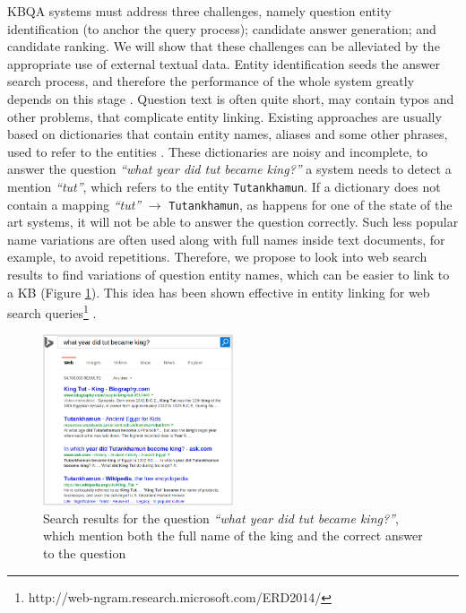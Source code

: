 KBQA systems must address three challenges, namely question entity identification (to anchor the query process); candidate answer generation; and candidate ranking.
We will show that these challenges can be alleviated by the appropriate use of external textual data.
Entity identification seeds the answer search process, and therefore the performance of the whole system greatly depends on this stage \cite{yao-scratch-qa-naacl2015}.
Question text is often quite short, may contain typos and other problems, that complicate entity linking.
Existing approaches are usually based on dictionaries that contain entity names, aliases and some other phrases, used to refer to the entities \cite{SPITKOVSKY12.266}.
These dictionaries are noisy and incomplete, \eg to answer the question \textit{``what year did tut became king?''} a system needs to detect a mention \textit{``tut''}, which refers to the entity \texttt{Tutankhamun}.
If a dictionary does not contain a mapping \textit{``tut''} $\rightarrow$ \texttt{Tutankhamun}, as happens for one of the state of the art systems, it will not be able to answer the question correctly.
Such less popular name variations are often used along with full names inside text documents, for example, to avoid repetitions.
Therefore, we propose to look into web search results to find variations of question entity names, which can be easier to link to a KB (Figure \ref{figure:text2kb:web_search_entitylink}).
This idea has been shown effective in entity linking for web search queries\footnote{http://web-ngram.research.microsoft.com/ERD2014/} \cite{SMAPH_ERD:2014}.

\begin{figure}[!ht]
\centering
\includegraphics[width=0.5\textwidth]{img/web_search_entitylink}
\caption{Search results for the question \textit{``what year did tut became king?''}, which mention both the full name of the king and the correct answer to the question}
\label{figure:text2kb:web_search_entitylink}
\end{figure}

